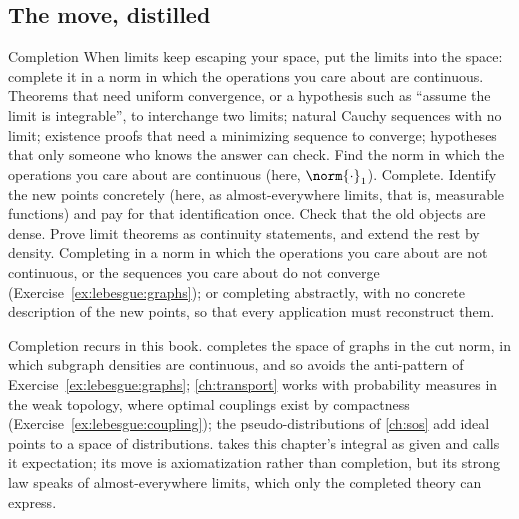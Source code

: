 \begin{refsection}
\section{The move, distilled}\label{sec:lebesgue:distilled}

\begin{move}{Completion}
 When limits keep escaping your space, put the limits into the space: complete it in a norm in which the operations you care about are continuous.
 Theorems that need uniform convergence, or a hypothesis such as ``assume the limit is integrable'', to interchange two limits; natural Cauchy sequences with no limit; existence proofs that need a minimizing sequence to converge; hypotheses that only someone who knows the answer can check.
 Find the norm in which the operations you care about are continuous (here, $\norm{\cdot}_1$). Complete. Identify the new points concretely (here, as almost-everywhere limits, that is, measurable functions) and pay for that identification once. Check that the old objects are dense. Prove limit theorems as continuity statements, and extend the rest by density.
 Completing in a norm in which the operations you care about are not continuous, or the sequences you care about do not converge (Exercise~\ref{ex:lebesgue:graphs}); or completing abstractly, with no concrete description of the new points, so that every application must reconstruct them.
\end{move}


Completion recurs in this book.  completes the space of graphs in the cut norm, in which subgraph densities are continuous, and so avoids the anti-pattern of Exercise~\ref{ex:lebesgue:graphs}; \cref{ch:transport} works with probability measures in the weak topology, where optimal couplings exist by compactness (Exercise~\ref{ex:lebesgue:coupling}); the pseudo-distributions of \cref{ch:sos} add ideal points to a space of distributions.  takes this chapter's integral as given and calls it expectation; its move is axiomatization rather than completion, but its strong law speaks of almost-everywhere limits, which only the completed theory can express.


\end{refsection}
